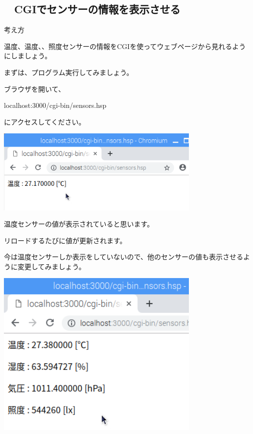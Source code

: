 
\clearpage\subsection*{\theExercise　CGIでセンサーの情報を表示させる}
\addtocounter{Exercise}{-1}\label{E:Sensors}

考え方

温度、温度、、照度センサーの情報をCGIを使ってウェブページから見れるようにしましょう。


\bigskip

まずは、プログラム実行してみましょう。

ブラウザを開いて、

localhost:3000/cgi-bin/sensors.hsp

にアクセスしてください。


%


\centering
\includegraphics[width=0.75\textwidth]{text07-img/ome7-img058.png}
\flushleft


温度センサーの値が表示されていると思います。

リロードするたびに値が更新されます。

今は温度センサーしか表示をしていないので、他のセンサーの値も表示させるように変更してみましょう。

%


\centering
\includegraphics[width=0.75\textwidth]{text07-img/ome7-img059.png}
\flushleft

